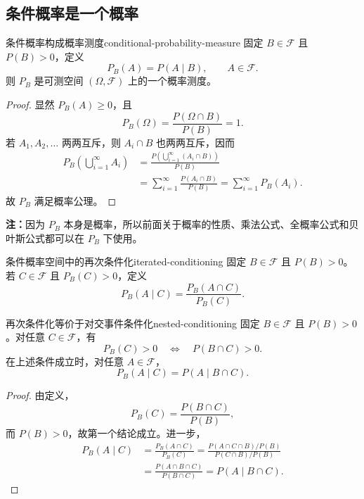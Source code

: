 \subsection*{条件概率是一个概率}

\begin{mytheorem}{条件概率构成概率测度}{conditional-probability-measure}
固定 $B\in\mathscr{F}$ 且 $P(B)>0$，定义
\[
P_B(A)=P(A\mid B),\qquad A\in\mathscr{F}.
\]
则 $P_B$ 是可测空间 $(\Omega,\mathscr{F})$ 上的一个概率测度。
\end{mytheorem}

\begin{proof}
显然 $P_B(A)\geq0$，且
\[
P_B(\Omega)=\frac{P(\Omega\cap B)}{P(B)}=1.
\]
若 $A_1,A_2,\ldots$ 两两互斥，则 $A_i\cap B$ 也两两互斥，因而
\[
\begin{aligned}
P_B\left(\bigcup_{i=1}^{\infty}A_i\right)
&=\frac{P\left(\bigcup_{i=1}^{\infty}(A_i\cap B)\right)}{P(B)}\\
&=\sum_{i=1}^{\infty}\frac{P(A_i\cap B)}{P(B)}
=\sum_{i=1}^{\infty}P_B(A_i).
\end{aligned}
\]
故 $P_B$ 满足概率公理。
\end{proof}

\textbf{注：}\quad 因为 $P_B$ 本身是概率，所以前面关于概率的性质、乘法公式、全概率公式和贝叶斯公式都可以在 $P_B$ 下使用。

\begin{mydefinition}{条件概率空间中的再次条件化}{iterated-conditioning}
固定 $B\in\mathscr{F}$ 且 $P(B)>0$。若 $C\in\mathscr{F}$ 且 $P_B(C)>0$，定义
\[
P_B(A\mid C)=\frac{P_B(A\cap C)}{P_B(C)}.
\]
\end{mydefinition}

\begin{proposition}{再次条件化等价于对交事件条件化}{nested-conditioning}
固定 $B\in\mathscr{F}$ 且 $P(B)>0$。对任意 $C\in\mathscr{F}$，有
\[
P_B(C)>0\quad\Longleftrightarrow\quad P(B\cap C)>0.
\]
在上述条件成立时，对任意 $A\in\mathscr{F}$，
\[
P_B(A\mid C)=P(A\mid B\cap C).
\]
\end{proposition}

\begin{proof}
由定义，
\[
P_B(C)=\frac{P(B\cap C)}{P(B)},
\]
而 $P(B)>0$，故第一个结论成立。进一步，
\[
\begin{aligned}
P_B(A\mid C)
&=\frac{P_B(A\cap C)}{P_B(C)}
=\frac{P(A\cap C\cap B)/P(B)}{P(C\cap B)/P(B)}\\
&=\frac{P(A\cap B\cap C)}{P(B\cap C)}
=P(A\mid B\cap C).
\end{aligned}
\]
\end{proof}


